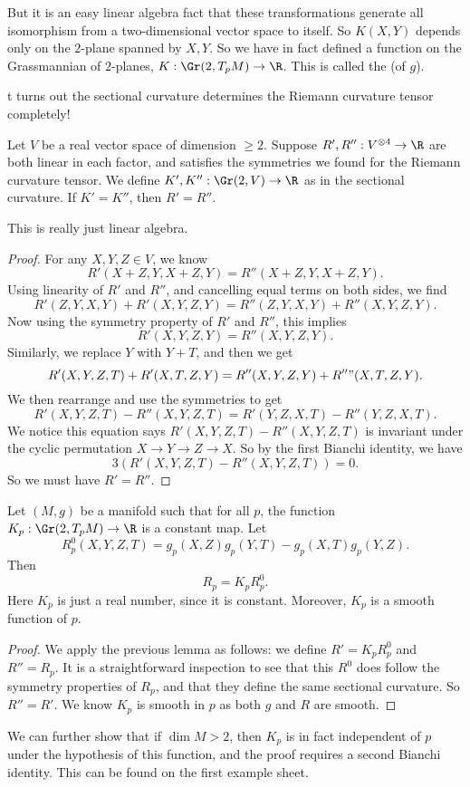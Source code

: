 \documentclass[a4paper]{article}
\begin{document}
But it is an easy linear algebra fact that these transformations generate all isomorphism from a two-dimensional vector space to itself. So $K(X, Y)$ depends only on the $2$-plane spanned by $X, Y$. So we have in fact defined a function on the Grassmannian of $2$-planes, $K: \Gr(2, T_p M) \to \R$. This is called the  (of $g$).

t turns out the sectional curvature determines the Riemann curvature tensor completely!
\begin{lemma}
  Let $V$ be a real vector space of dimension $\geq 2$. Suppose $R', R'': V^{\otimes 4} \to \R$ are both linear in each factor, and satisfies the symmetries we found for the Riemann curvature tensor. We define $K', K'': \Gr(2, V) \to \R$ as in the sectional curvature. If $K' = K''$, then $R' = R''$.
\end{lemma}
This is really just linear algebra.
\begin{proof}
  For any $X, Y, Z \in V$, we know
  \[
    R'(X + Z, Y, X + Z, Y) = R''(X + Z, Y, X + Z, Y).
  \]
  Using linearity of $R'$ and $R''$, and cancelling equal terms on both sides, we find
  \[
    R'(Z, Y, X, Y) + R'(X, Y, Z, Y) = R''(Z, Y, X, Y) + R''(X, Y, Z, Y).
  \]
  Now using the symmetry property of $R'$ and $R''$, this implies
  \[
    R'(X, Y, Z, Y) = R''(X, Y, Z, Y).
  \]
  Similarly, we replace $Y$ with $Y + T$, and then we get
  \[
    R'(X, Y, Z, T) + R'(X, T, Z, Y) = R''(X, Y, Z, Y) + R''"(X, T, Z, Y).
  \]
  We then rearrange and use the symmetries to get
  \[
    R'(X, Y, Z, T) - R''(X, Y, Z, T) = R'(Y, Z, X, T) - R''(Y, Z, X, T).
  \]
  We notice this equation says $R'(X, Y, Z, T) - R''(X, Y, Z, T)$ is invariant under the cyclic permutation $X \to Y \to Z \to X$. So by the first Bianchi identity, we have
  \[
    3(R'(X, Y, Z, T) - R''(X, Y, Z, T)) = 0.
  \]
  So we must have $R' = R''$.
\end{proof}

\begin{cor}
  Let $(M, g)$ be a manifold such that for all $p$, the function $K_p: \Gr(2, T_p M) \to \R$ is a constant map. Let
  \[
    R^0_p (X, Y, Z, T) = g_p(X, Z) g_p(Y, T) - g_p(X, T) g_p(Y, Z).
  \]
  Then
  \[
    R_p= K_p R_p^0.
  \]
  Here $K_p$ is just a real number, since it is constant. Moreover, $K_p$ is a smooth function of $p$.
\end{cor}

\begin{proof}
  We apply the previous lemma as follows: we define $R' = K_p R_p^0$ and $R'' = R_p$. It is a straightforward inspection to see that this $R^0$ does follow the symmetry properties of $R_p$, and that they define the same sectional curvature. So $R'' = R'$. We know $K_p$ is smooth in $p$ as both $g$ and $R$ are smooth.
\end{proof}
We can further show that if $\dim M > 2$, then $K_p$ is in fact independent of $p$ under the hypothesis of this function, and the proof requires a second Bianchi identity. This can be found on the first example sheet.
\end{document}
